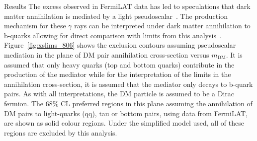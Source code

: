 \begin{section}{Results}
The excess observed in FermiLAT data has led to speculations that dark matter annihilation is mediated by a light pseudoscalar~\cite{Calore:2014nla}. 
The production mechanism for these $\gamma$ rays can be interpreted under dark matter annihilation to b-quarks allowing for direct 
comparison with limits from this analysis~\cite{Buchmueller:2015eea,Buckley:2014fba,Harris:2014hga}. Figure~\ref{fig:xslims_806} shows 
the exclusion contours assuming pseudoscalar mediation in the plane of DM pair annihilation cross-section versus $m_{\textrm{DM}}$. 
It is assumed that only heavy quarks (top and bottom quarks) contribute in the production of the mediator while for  
the interpretation of the limits in the annihilation cross-section, it is assumed that the mediator only decays to b-quark pairs. 
As with all interpretations, the DM particle is assumed to be a Dirac fermion.
The 68\% CL preferred regions in this plane assuming the annihilation of DM pairs to light-quarks (qq), tau or bottom pairs, using data from FermiLAT, 
are shown as solid colour regions. Under the simplified model used, all of these regions are excluded by this analysis.



\end{section}
